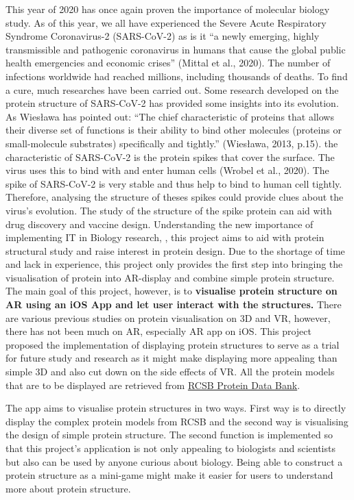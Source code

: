 This year of 2020 has once again proven the importance of molecular biology study. As of this year, we all have experienced the Severe Acute Respiratory Syndrome Coronavirus-2 (SARS-CoV-2) as is it “a newly emerging, highly transmissible and pathogenic coronavirus in humans that cause the global public health emergencies and economic crises” (Mittal et al., 2020). The number of infections worldwide had reached millions, including thousands of deaths. To find a cure, much researches have been carried out. Some research developed on the protein structure of SARS-CoV-2 has provided some insights into its evolution. As Wiesława has pointed out: “The chief characteristic of proteins that allows their diverse set of functions is their ability to bind other molecules (proteins or small-molecule substrates) specifically and tightly.” (Wiesława, 2013, p.15). the characteristic of SARS-CoV-2 is the protein spikes that cover the surface. The virus uses this to bind with and enter human cells (Wrobel et al., 2020). The spike of SARS-CoV-2 is very stable and thus help to bind to human cell tightly. Therefore, analysing the structure of theses spikes could provide clues about the virus’s evolution. The study of the structure of the spike protein can aid with drug discovery and vaccine design. 
Understanding the new importance of implementing IT in Biology research, , this project aims to aid with protein structural study and raise interest in protein design.
Due to the shortage of time and lack in experience, this project only provides the first step into bringing the visualisation of protein into AR-display and combine simple protein structure. The main goal of this project, however, is to \textbf{visualise protein structure on AR using an iOS App and let user interact with the structures. }
There are various previous studies on protein visualisation on 3D and VR, however, there has not been much on AR, especially AR app on iOS. This project proposed the implementation of displaying protein structures to serve as a trial for future study and research as it might make displaying more appealing than simple 3D and also cut down on the side effects of VR. All the protein models that are to be displayed are retrieved from \href{https://www.rcsb.org/}{RCSB Protein Data Bank}. 

The app aims to visualise protein structures in two ways. First way is to directly display the complex protein models from RCSB and the second way is visualising the design of simple protein structure. The second function is implemented so that this project's application is not only appealing to biologists and scientists but also can be used by anyone curious about biology. Being able to construct a protein structure as a mini-game might make it easier for users to understand more about protein structure. 

